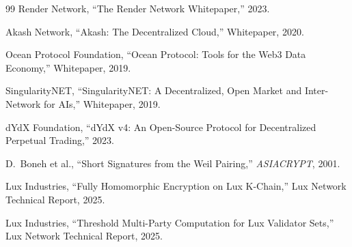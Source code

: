 \documentclass[11pt,letterpaper]{article}
\begin{document}
\begin{thebibliography}{99}
Render Network, ``The Render Network Whitepaper,'' 2023.

Akash Network, ``Akash: The Decentralized Cloud,'' Whitepaper, 2020.

Ocean Protocol Foundation, ``Ocean Protocol: Tools for the Web3 Data Economy,'' Whitepaper, 2019.

SingularityNET, ``SingularityNET: A Decentralized, Open Market and Inter-Network for AIs,'' Whitepaper, 2019.

dYdX Foundation, ``dYdX v4: An Open-Source Protocol for Decentralized Perpetual Trading,'' 2023.

D.~Boneh et al., ``Short Signatures from the Weil Pairing,'' \textit{ASIACRYPT}, 2001.

Lux Industries, ``Fully Homomorphic Encryption on Lux K-Chain,'' Lux Network Technical Report, 2025.

Lux Industries, ``Threshold Multi-Party Computation for Lux Validator Sets,'' Lux Network Technical Report, 2025.

\end{thebibliography}
\end{document}
